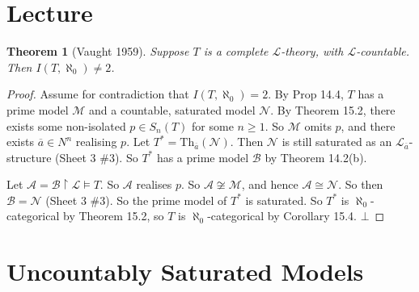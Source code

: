 \documentclass[]{article}
\theoremstyle{custhm}
\newtheorem{theorem}{Theorem}[section]
\theoremstyle{cusdef}
\theoremstyle{custhm}
\theoremstyle{custhm}
\theoremstyle{custhm}
\theoremstyle{ex}
\theoremstyle{custhm}
\theoremstyle{cusdef}
\theoremstyle{remark}
\theoremstyle{remark}
\renewcommand{\L}{\mathcal{L}}
\newcommand{\M}{\mathcal{M}}
\renewcommand{\bar}{\overline}
\newcommand{\Th}{\textrm{Th}}
\newcommand{\false}{\bot}
\newcommand{\N}{\mathcal{N}}
\newcommand{\A}{\mathcal{A}}
\begin{document}
\section{Lecture}

\begin{theorem}[Vaught 1959]
	Suppose $T$ is a complete $\L$-theory, with $\L$-countable. Then $I(T,\aleph_0) \ne 2$.
\end{theorem}
\begin{proof}
	Assume for contradiction that $I(T,\aleph_0) = 2$. By Prop 14.4, $T$ has a prime model $\M$ and a countable, saturated model $\N$. By Theorem 15.2, there exists some non-isolated $p\in S_n(T)$ for some $n\ge 1$. So $\M$ omits $p$, and there exists $\bar{a}\in N^n$ realising $p$. Let $T^\ast = \Th_{\bar{a}}(\N)$. Then $\N$ is still saturated as an $\L_{\bar{a}}$-structure (Sheet 3 \#3). So $T^\ast$ has a prime model $\mathcal{B}$ by Theorem 14.2(b).

	Let $\A = \mathcal{B}\upharpoonright\L\models T$. So $\A$ realises $p$. So $\A\not\cong\M$, and hence $\A\cong \N$. So then $\mathcal{B} = \N$ (Sheet 3 \#3). So the prime model of $T^\ast$ is saturated. So $T^\ast$ is $\aleph_0$-categorical by Theorem 15.2, so $T$ is $\aleph_0$-categorical by Corollary 15.4. $\false$
\end{proof}

\section*{Uncountably Saturated Models}
\end{document}
